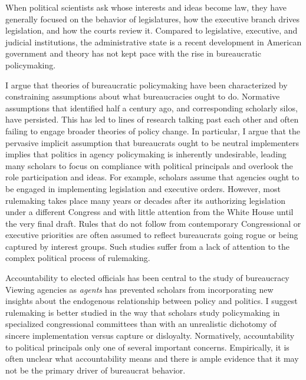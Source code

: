 When political scientists ask whose interests and ideas become law, they have generally focused on the behavior of legislatures, how the executive branch drives legislation, and how the courts review it. Compared to legislative, executive, and judicial institutions, the administrative state is a recent development in American government and theory has not kept pace with the rise in bureaucratic policymaking. 

I argue that theories of bureaucratic policymaking have been characterized by constraining assumptions about what bureaucracies ought to do.  Normative assumptions that \citet{Wilson1967} identified half a century ago, and corresponding scholarly silos, have persisted. This has led to lines of research talking past each other and often failing to engage broader theories of policy change. In particular, I argue that the pervasive implicit assumption that bureaucrats ought to be neutral implementers implies that politics in agency policymaking is inherently undesirable, leading many scholars to focus on compliance with political principals and overlook the role participation and ideas. For example, scholars assume that agencies ought to be engaged in implementing legislation and executive orders. However, most rulemaking takes place many years or decades after its authorizing legislation under a different Congress and with little attention from the White House until the very final draft. Rules that do not follow from contemporary Congressional or executive priorities are often assumed to reflect bureaucrats going rogue or being captured by interest groups. Such studies suffer from a lack of attention to the complex political process of rulemaking. 

Accountability to elected officials has been central to the study of bureaucracy \citep{Epstein1999,Huber2002,McCubbins1984,Wilson1989,Potter2016Slow-RollingRulemaking,Lowande2018PoliticizationAgencies} %
Viewing agencies as \textit{agents} has prevented scholars from incorporating new insights about the endogenous relationship between policy and politics. I suggest rulemaking is better studied in the way that scholars study policymaking in specialized congressional committees than with an unrealistic dichotomy of sincere implementation versus capture or disloyalty. Normatively, accountability to political principals only one of several important concerns. Empirically, it is often unclear what accountability means and there is ample evidence that it may not be the primary driver of bureaucrat behavior.

